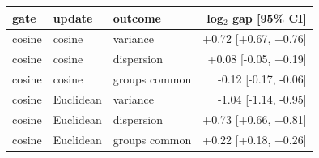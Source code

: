 \begin{tabular}{lllr}
\toprule
gate & update & outcome & log$_2$ gap [95\% CI] \\
\midrule
cosine & cosine & variance & +0.72 [+0.67, +0.76] \\
cosine & cosine & dispersion & +0.08 [-0.05, +0.19] \\
cosine & cosine & groups common & -0.12 [-0.17, -0.06] \\
cosine & Euclidean & variance & -1.04 [-1.14, -0.95] \\
cosine & Euclidean & dispersion & +0.73 [+0.66, +0.81] \\
cosine & Euclidean & groups common & +0.22 [+0.18, +0.26] \\
\bottomrule
\end{tabular}
